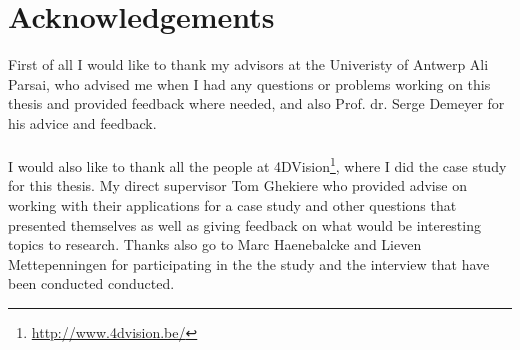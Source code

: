 \clearpage 
{} 
{}
\chapter*{Acknowledgements}
First of all I would like to thank my advisors at the Univeristy of Antwerp Ali Parsai, who advised me when I had any questions or problems working on this thesis and provided feedback where needed, and also Prof. dr. Serge Demeyer for his advice and feedback.
\\
\\
I would also like to thank all the people at 4DVision\footnote{\url{http://www.4dvision.be/}}, where I did the case study for this thesis. 
My direct supervisor Tom Ghekiere who provided advise on working with their applications for a case study and other questions that presented themselves as well as giving feedback on what would be interesting topics to research.
Thanks also go to Marc Haenebalcke and Lieven Mettepenningen for participating in the the study and the interview that have been conducted conducted.

